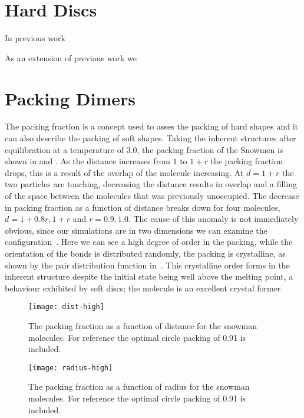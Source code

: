 \section{Hard Discs}

In previous work 

As an extension of previous work we 

\section{Packing Dimers}

The packing fraction is a concept used to asses the packing of hard shapes and it can also describe the packing of soft shapes. Taking the inherent structures after equilibration at a temperature of 3.0, the packing fraction of the Snowmen is shown in  and . As the distance increases from $1$ to $1+r$ the packing fraction drops, this is a result of the overlap of the molecule increasing. At $d=1+r$ the two particles are touching, decreasing the distance results in overlap and a filling of the space between the molecules that was previously unoccupied. The decrease in packing fraction as a function of distance breaks down for four molecules, $d=1+0.8r, 1+r$ and $r=0.9, 1.0$. The cause of this anomaly is not immediately obvious, since our simulations are in two dimensions we can examine the configuration~. Here we can see a high degree of order in the packing, while the orientation of the bonds is distributed randomly, the packing is crystalline, as shown by the pair distribution function in~. This crystalline order forms in the inherent structure despite the initial state being well above the melting point, a behaviour exhibited by soft discs; the molecule is an excellent crystal former.

\begin{figure}
    \centering
    \texttt{[image: dist-high]}
    \caption[Packing fraction of snowmen as a function of distance ($T=3.0$)]{The packing fraction as a function of distance for the snowman molecules. For reference the optimal circle packing of 0.91 is included.}
    \label{fig:snowman dist high}
\end{figure}

\begin{figure}
    \centering
    \texttt{[image: radius-high]}
    \caption[Packing fraction of snowmen as a function of radius ($T=3.0$)]{The packing fraction as a function of radius for the snowman molecules. For reference the optimal circle packing of 0.91 is included.}
    \label{fig:snowman radius high}
\end{figure}

